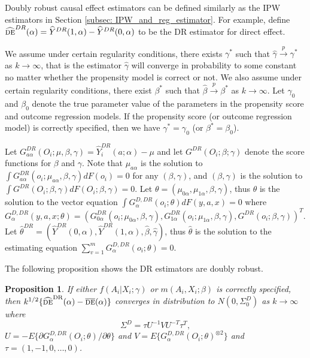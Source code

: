 \documentclass[oupdraft]{biostatistics}
\newtheorem{proposition}{Proposition}
\begin{document}
Doubly robust causal effect estimators can be defined similarly as the IPW estimators in Section \ref{subsec: IPW_and_reg_estimator}. For example, define $\widehat{\textsc{de}}^{DR}(\alpha)=\widehat{Y}^{DR}(1,\alpha)-\widehat{Y}^{DR}(0,\alpha)$ to be the DR estimator for direct effect. 


We assume under certain regularity conditions, there exists $\gamma^{*}$ such that $\hat{\gamma}\xrightarrow{p}\gamma^{*}$ as $k\rightarrow\infty$, that is the estimator $\hat{\gamma}$ will converge in probability to some constant no matter whether the propensity model is correct or not. We also assume under certain regularity conditions, there exist $\beta^{*}$ such that $\hat{\beta}\xrightarrow{p}\beta^{*}$ as $k\rightarrow\infty$. Let $\gamma_0$ and $\beta_0$ denote the true parameter value of the parameters in the propensity score and outcome regression models. If the propensity score (or outcome regression model) is correctly specified, then we have $\gamma^{*}=\gamma_0$ (or $\beta^{*}=\beta_0$).

Let $G^{DR}_{a\alpha}(O_i;\mu,\beta,\gamma) =\widehat{Y}_i^{DR}(a;\alpha)- \mu$ and let $G^{DR}(O_i;\beta;\gamma)$ denote the score functions for $\beta$ and $\gamma$. Note that $\mu_{a\alpha}$ is the solution to $\int G^{DR}_{a\alpha}(o_i;\mu_{a\alpha},\beta,\gamma) dF(o_i) = 0$ for any $(\beta,\gamma)$, and $(\beta,\gamma)$ is the solution to $\int G^{DR}(O_i;\beta,\gamma)dF(O_i;\beta,\gamma)=0$. Let $\theta=(\mu_{0\alpha},\mu_{1\alpha},\beta,\gamma)$, thus $\theta$ is the solution to the vector equation $\int G^{D, DR}_{\alpha}(o_i;\theta) dF(y,a,x) = 0$ where $G^{D,DR}_{\alpha}(y,a,x;\theta)=(G^{DR}_{0\alpha}(o_i;\mu_{0\alpha},\beta,\gamma),G^{DR}_{1\alpha}(o_i;\mu_{1\alpha},\beta,\gamma),G^{DR}(o_i;\beta,\gamma))^T$. Let $\hat\theta^{DR}=(\hat Y^{DR}(0,\alpha),\hat Y^{DR}(1,\alpha),\hat\beta,\hat\gamma)$, thus $\hat \theta$ is the solution to the estimating equation $\sum_{v=1}^m G^{D,DR}_{\alpha}(o_i;\theta)=0$. 

The following proposition shows the DR estimators are doubly robust.


\begin{proposition}\label{thm: DR_CAN}
If either $f(A_i|X_i;\gamma)$ or $m(A_i,X_i;\beta)$ is correctly specified, then \emph{$k^{1/2}\{\widehat{\textsc{de}}^{\text{DR}}(\alpha)-\overline{\textsc{de}}(\alpha)\}$} converges in distribution to $N(0,\Sigma_0^{D})$ as $k \to \infty$ where 
\[
\Sigma^{D} = \tau U^{-1} V U^{-T}\tau^T,
\]
$U=-E\{\partial G_{\alpha}^{D,DR}(O_i;\theta)/\partial \theta\}$ and $V=E\{G_{\alpha}^{D,DR}(O_i;\theta)^{\otimes 2}\}$ and $\tau=(1,-1, 0,\ldots,0)$.
\end{proposition}
\end{document}
